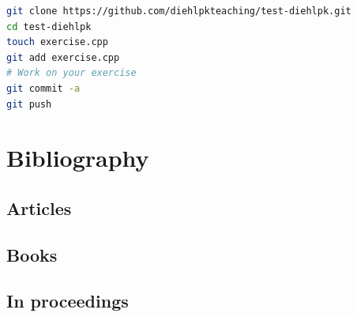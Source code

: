 \documentclass[11pt,fleqn]{book} %
\begin{document}
\begin{lstlisting}[language=bash,caption={Setting up a ssh key\label{git:push}},float,floatplacement=tb]
git clone https://github.com/diehlpkteaching/test-diehlpk.git
cd test-diehlpk
touch exercise.cpp
git add exercise.cpp
# Work on your exercise
git commit -a
git push
\end{lstlisting}

\newpage
\theendnotes



\chapter*{Bibliography}


\section*{Articles}
\printbibliography[heading=bibempty,type=article]


\section*{Books}
\printbibliography[heading=bibempty,type=book]


\section*{In proceedings}
\printbibliography[heading=bibempty,type=inproceedings]





\cleardoublepage %
\setlength{\columnsep}{0.75cm} %
\printindex %
\end{document}
